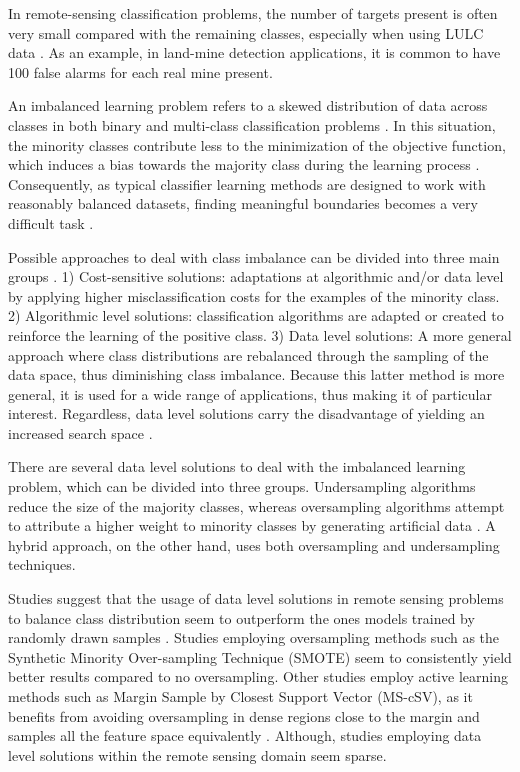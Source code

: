 \documentclass[parskip=full]{scrartcl}
\begin{document}
In remote-sensing classification problems, the number of targets present is
often very small compared with the remaining classes, especially when using LULC
data \cite{Williams2009, Cenggoro2018}. As an example, in land-mine detection
applications, it is common to have 100 false alarms for each real mine present.

An imbalanced learning problem refers to a skewed distribution of data across
classes in both binary and multi-class classification problems \cite{Abdi2016}.
In this situation, the minority classes contribute less to the minimization of
the objective function, which induces a bias towards the majority class during
the learning process \cite{Douzas2019}. Consequently, as typical classifier
learning methods are designed to work with reasonably balanced datasets, finding
meaningful boundaries becomes a very difficult task \cite{Saez2016}.

Possible approaches to deal with class imbalance can be divided into three main
groups \cite{Fernandez2013}. 1) Cost-sensitive solutions: adaptations at
algorithmic and/or data level by applying higher misclassification costs for the
examples of the minority class. 2) Algorithmic level solutions: classification
algorithms are adapted or created to reinforce the learning of the positive
class. 3) Data level solutions: A more general approach where class
distributions are rebalanced through the sampling of the data space, thus
diminishing class imbalance. Because this latter method is more general, it is
used for a wide range of applications, thus making it of particular interest.
Regardless, data level solutions carry the disadvantage of yielding an increased
search space \cite{Fernandez2013}.

There are several data level solutions to deal with the imbalanced learning
problem, which can be divided into three groups. Undersampling algorithms reduce
the size of the majority classes, whereas oversampling algorithms attempt to
attribute a higher weight to minority classes by generating artificial data
\cite{Mellor2015}. A hybrid approach, on the other hand, uses both oversampling
and undersampling techniques.

Studies suggest that the usage of data level solutions in remote sensing
problems to balance class distribution seem to outperform the ones models
trained by randomly drawn samples \cite{Wang2019, Mellor2015}.  Studies
employing oversampling methods such as the Synthetic Minority Over-sampling
Technique (SMOTE) \cite{Chawla2002} seem to consistently yield better results
\cite{Johnson2013, Geib2015} compared to no oversampling. Other studies employ
active learning methods such as Margin Sample by Closest Support Vector
(MS-cSV), as it benefits from avoiding oversampling in dense regions close to
the margin and samples all the feature space equivalently \cite{Tuia2009}.
Although, studies employing data level solutions within the remote sensing
domain seem sparse.
\end{document}
